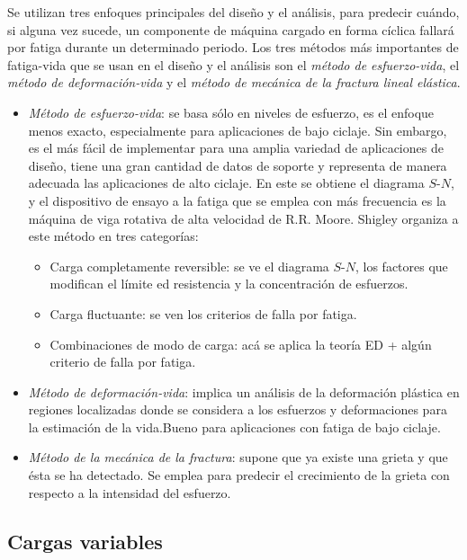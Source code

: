 \documentclass[spanish,11pt,a4paper]{article}
\begin{document}
	Se utilizan tres enfoques principales del diseño y el análisis, para predecir cuándo, si alguna
	vez sucede, un componente de máquina cargado en forma cíclica fallará por fatiga durante
	un determinado periodo. Los tres métodos más importantes de fatiga-vida que se usan en el diseño y el análisis son el \emph{método de esfuerzo-vida}, el \emph{método de deformación-vida} y el \emph{método de mecánica de la fractura lineal elástica}.
	\begin{itemize}
		\item \emph{Método de esfuerzo-vida}: se basa sólo en niveles de esfuerzo, es el enfoque menos
		exacto, especialmente para aplicaciones de bajo ciclaje. Sin embargo, es el más fácil de implementar para una amplia variedad de aplicaciones de diseño, tiene una gran cantidad de datos de soporte y representa de manera adecuada las aplicaciones de alto ciclaje. En este se obtiene el diagrama $S$-$N$, y el dispositivo de ensayo a la fatiga que se emplea con más frecuencia es la máquina de viga rotativa de alta velocidad de R.R. Moore. Shigley organiza a este método en tres categorías: \begin{itemize}
			\item Carga completamente reversible: se ve el diagrama $S$-$N$, los factores que modifican el límite ed resistencia y la concentración de esfuerzos.
			\item Carga fluctuante: se ven los criterios de falla por fatiga.
			\item Combinaciones de modo de carga: acá se aplica la teoría ED + algún criterio de falla por fatiga.
		\end{itemize}
		
		\item \emph{Método de deformación-vida}: implica un análisis de la deformación
		plástica en regiones localizadas donde se considera a los esfuerzos y deformaciones para
		la estimación de la vida.Bueno para aplicaciones con fatiga	de bajo ciclaje.
		
		\item \emph{Método de la mecánica de la fractura}: supone que ya existe una grieta y que ésta
		se ha detectado. Se emplea para predecir el crecimiento de la grieta con respecto a
		la intensidad del esfuerzo.
	\end{itemize}
	\subsection{Cargas variables}
	
\end{document}
